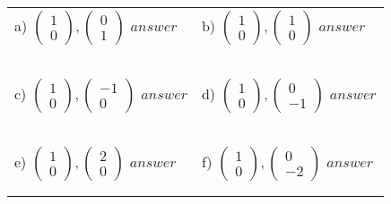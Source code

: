 \documentclass[fontsize=12pt]{scrartcl}
\begin{document}
\newline
\begin{tabular}{p{9cm}p{9cm}}
a) $\begin{pmatrix}1\\0\end{pmatrix}, \begin{pmatrix}0\\1\end{pmatrix}$
 \quad $answer$
&b) $\begin{pmatrix}1\\0\end{pmatrix}, \begin{pmatrix}1\\0\end{pmatrix}$
 \quad $answer$
\\\\\\
\\\\\\

c) $\begin{pmatrix}1\\0\end{pmatrix}, \begin{pmatrix}-1\\0\end{pmatrix}$
 \quad $answer$
&d) $\begin{pmatrix}1\\0\end{pmatrix}, \begin{pmatrix}0\\-1\end{pmatrix}$
 \quad $answer$
\\\\\\
\\\\\\

e) $\begin{pmatrix}1\\0\end{pmatrix}, \begin{pmatrix}2\\0\end{pmatrix}$
 \quad $answer$
&f) $\begin{pmatrix}1\\0\end{pmatrix}, \begin{pmatrix}0\\-2\end{pmatrix}$
 \quad $answer$
\\\\\\
\end{tabular}
\end{document}
